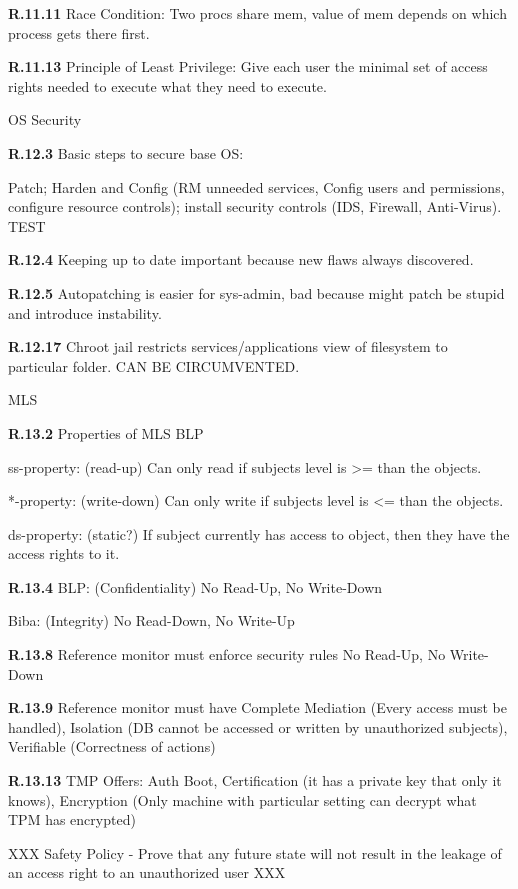 \documentclass{report}
\begin{document}
{\bf R.11.11}
Race Condition: Two procs share mem, value of mem depends on which process gets
there first.

{\bf R.11.13}
Principle of Least Privilege: Give each user the minimal set of access rights
needed to execute what they need to execute.


\large{OS Security}

{\bf R.12.3}
Basic steps to secure base OS:

Patch; Harden and Config (RM unneeded services, Config users and permissions,
configure resource controls); install security controls (IDS, Firewall,
Anti-Virus). TEST


{\bf R.12.4}
Keeping up to date important because new flaws always discovered.

{\bf R.12.5}
Autopatching is easier for sys-admin, bad because might patch be stupid and
introduce instability.




{\bf R.12.17}
Chroot jail restricts services/applications view of filesystem to particular
folder. CAN BE CIRCUMVENTED.

\large{MLS}

{\bf R.13.2}
Properties of MLS BLP

ss-property: (read-up) Can only read if subjects level is >= than the objects.

*-property: (write-down) Can only write if subjects level is <= than the objects.

ds-property: (static?) If subject currently has access to object, then they have the
access rights to it.

{\bf R.13.4}
BLP: (Confidentiality) No Read-Up, No Write-Down

Biba: (Integrity) No Read-Down, No Write-Up

{\bf R.13.8}
Reference monitor must enforce security rules No Read-Up, No Write-Down

{\bf R.13.9}
Reference monitor must have Complete Mediation (Every access must be handled), Isolation (DB cannot be accessed or
written by unauthorized subjects), Verifiable (Correctness of actions)

{\bf R.13.13}
TMP Offers: Auth Boot, Certification (it has a private key that only it knows),
Encryption (Only machine with particular setting can decrypt what TPM has
encrypted)


XXX Safety Policy - Prove that any future state will not result in the leakage
of an access right to an unauthorized user XXX
\end{document}
